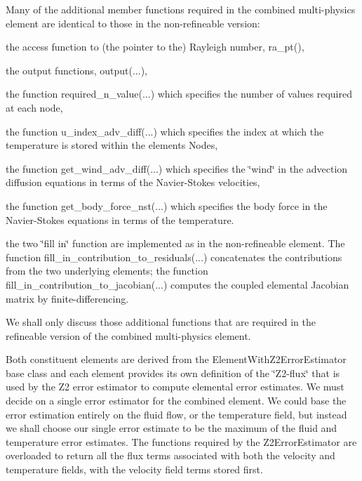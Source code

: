 Many of the additional member functions required in the combined multi-\/physics element are identical to those in the non-\/refineable version\+:
\begin{DoxyItemize}
\item the access function to (the pointer to the) Rayleigh number, {\ttfamily ra\+\_\+pt()},
\item the output functions, {\ttfamily output}(...),
\item the function {\ttfamily required\+\_\+n\+\_\+value}(...) which specifies the number of values required at each node,
\item the function {\ttfamily u\+\_\+index\+\_\+adv\+\_\+diff}(...) which specifies the index at which the temperature is stored within the elements\textquotesingle{} {\ttfamily Nodes},
\item the function {\ttfamily get\+\_\+wind\+\_\+adv\+\_\+diff}(...) which specifies the \char`\"{}wind\char`\"{} in the advection diffusion equations in terms of the Navier-\/\+Stokes velocities,
\item the function {\ttfamily get\+\_\+body\+\_\+force\+\_\+nst}(...) which specifies the body force in the Navier-\/\+Stokes equations in terms of the temperature.
\item the two \char`\"{}fill in\char`\"{} function are implemented as in the non-\/refineable element. The function {\ttfamily fill\+\_\+in\+\_\+contribution\+\_\+to\+\_\+residuals}(...) concatenates the contributions from the two underlying elements; the function {\ttfamily fill\+\_\+in\+\_\+contribution\+\_\+to\+\_\+jacobian}(...) computes the coupled elemental Jacobian matrix by finite-\/differencing.
\end{DoxyItemize}We shall only discuss those additional functions that are required in the refineable version of the combined multi-\/physics element.

Both constituent elements are derived from the {\ttfamily Element\+With\+Z2\+Error\+Estimator} base class and each element provides its own definition of the \char`\"{}\+Z2-\/flux\char`\"{} that is used by the Z2 error estimator to compute elemental error estimates. We must decide on a single error estimator for the combined element. We could base the error estimation entirely on the fluid flow, or the temperature field, but instead we shall choose our single error estimate to be the maximum of the fluid and temperature error estimates. The functions required by the {\ttfamily Z2\+Error\+Estimator} are overloaded to return all the flux terms associated with both the velocity and temperature fields, with the velocity field terms stored first.

